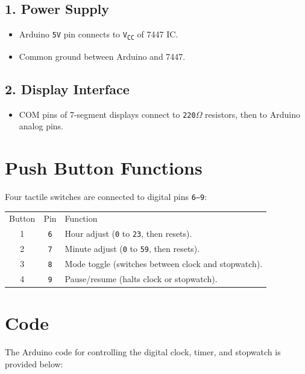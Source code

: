 \documentclass[journal]{IEEEtran}
\begin{document}
\subsection*{1. Power Supply}
\begin{itemize}
    \item Arduino \texttt{5V} pin connects to \texttt{V\textsubscript{CC}} of 7447 IC.
    \item Common ground between Arduino and 7447.
\end{itemize}

\subsection*{2. Display Interface}
\begin{itemize}
    \item COM pins of 7-segment displays connect to \texttt{220$\Omega$} resistors, then to Arduino analog pins.
\end{itemize}

\section*{Push Button Functions}
Four tactile switches are connected to digital pins \texttt{6--9}:

\begin{table}[h]
    \centering
    \renewcommand{\arraystretch}{1.2}
    \begin{tabular}{c c l}
        Button & Pin & Function \\
        1 & \texttt{6} & Hour adjust (\texttt{0} to \texttt{23}, then resets). \\
        2 & \texttt{7} & Minute adjust (\texttt{0} to \texttt{59}, then resets). \\
        3 & \texttt{8} & Mode toggle (switches between clock and stopwatch). \\
        4 & \texttt{9} & Pause/resume (halts clock or stopwatch). \\
    \end{tabular}
\end{table}



\newpage



\section{Code}
The Arduino code for controlling the digital clock, timer, and stopwatch is provided below:
\end{document}
